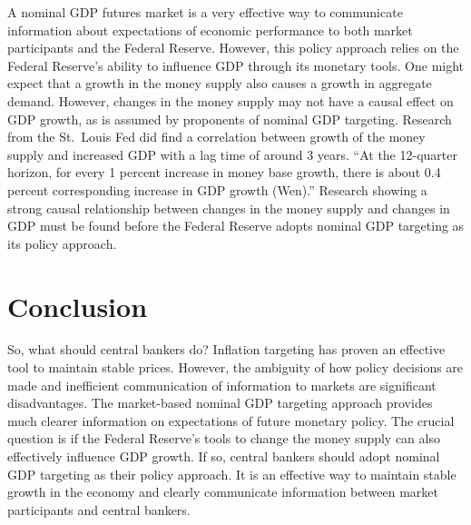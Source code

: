 \documentclass[11pt,]{article}
\begin{document}
A nominal GDP futures market is a very effective way to communicate
information about expectations of economic performance to both market
participants and the Federal Reserve. However, this policy approach
relies on the Federal Reserve's ability to influence GDP through its
monetary tools. One might expect that a growth in the money supply also
causes a growth in aggregate demand. However, changes in the money
supply may not have a causal effect on GDP growth, as is assumed by
proponents of nominal GDP targeting. Research from the St.~Louis Fed did
find a correlation between growth of the money supply and increased GDP
with a lag time of around 3 years. ``At the 12-quarter horizon, for
every 1 percent increase in money base growth, there is about 0.4
percent corresponding increase in GDP growth (Wen).'' Research showing a
strong causal relationship between changes in the money supply and
changes in GDP must be found before the Federal Reserve adopts nominal
GDP targeting as its policy approach.

\section{Conclusion}\label{conclusion}

So, what should central bankers do? Inflation targeting has proven an
effective tool to maintain stable prices. However, the ambiguity of how
policy decisions are made and inefficient communication of information
to markets are significant disadvantages. The market-based nominal GDP
targeting approach provides much clearer information on expectations of
future monetary policy. The crucial question is if the Federal Reserve's
tools to change the money supply can also effectively influence GDP
growth. If so, central bankers should adopt nominal GDP targeting as
their policy approach. It is an effective way to maintain stable growth
in the economy and clearly communicate information between market
participants and central bankers.

\newpage
\singlespacing 

\end{document}
